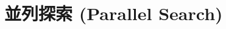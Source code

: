 \begin{comment}

\subsection{Best-First Width Search (最良優先幅制限探索)}
\label{sec:width-based-heuristic-search}

\cite{geffner2015}


\subsection{Novelty Heuristics (新奇性に基づくヒューリスティック)}
\label{sec:novelty-heuristics}

ここまでの議論では新奇性を枝刈りのために使った。
しかしノードを捨ててしまう枝刈りは解が存在する問題でも解を発見できなくなってしまうという問題がある。
新奇性を使ってノードを完全に捨ててしまうのではなく、新奇性に基づいてノードを展開する優先度を決めるというアプローチをとることができる \cite{geffner2015}。つまり新奇性をヒューリスティックに使うということである。
この方法ではノードは完全に捨てられることはないので解を捨ててしまう可能性はなくなる。

ここで注意しなければならないのは新奇性は生成済みノード集合に依存する値である。
つまり新奇性に基づくヒューリスティック関数は状態$s$の関数ではなく、状態とクローズドリストの関数となる。つまり、同じ状態のノードでもヒューリスティック値が異なる場合がある。

\end{comment}



\section{並列探索 (Parallel Search)}
\label{sec:parallel-search}

